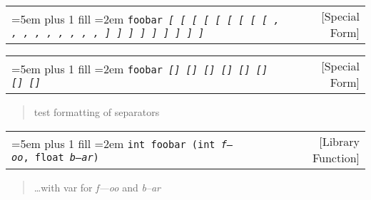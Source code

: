 \documentclass{book}
\newcommand\GNUTexinfocommandstyletextvar[1]{{\normalfont{}\textsl{#1}}}%
\begin{document}
\noindent\begin{tabularx}{\linewidth}{@{}Xr}
\rightskip=5em plus 1 fill
\hangindent=2em
\texttt{foobar \EmbracOn{}\textnormal{\textsl{[ \EmbracOff{}\textnormal{[}\EmbracOn{} \textsl{[} \texttt{[} \texttt{[} \EmbracOff{}\textnormal{\textsl{[}}\EmbracOn{} \EmbracOff{}\textnormal{\texttt{[}}\EmbracOn{} \EmbracOff{}\textnormal{\texttt{\textsl{[}}}\EmbracOn{} \EmbracOff{}\textnormal{\texttt{[}}\EmbracOn{} , \EmbracOff{}\textnormal{,}\EmbracOn{} \textsl{,} \texttt{,} \texttt{,} \EmbracOff{}\textnormal{\textsl{,}}\EmbracOn{} \EmbracOff{}\textnormal{\texttt{,}}\EmbracOn{} \EmbracOff{}\textnormal{\texttt{\textsl{,}}}\EmbracOn{} \EmbracOff{}\textnormal{\texttt{,}}\EmbracOn{} ] \EmbracOff{}\textnormal{]}\EmbracOn{} \textsl{]} \texttt{]} \texttt{]} \EmbracOff{}\textnormal{\textsl{]}}\EmbracOn{} \EmbracOff{}\textnormal{\texttt{]}}\EmbracOn{} \EmbracOff{}\textnormal{\texttt{\textsl{]}}}\EmbracOn{} \EmbracOff{}\textnormal{\texttt{]}}\EmbracOn{}}}\EmbracOff{}}& [Special Form]
\end{tabularx}

%

\noindent\begin{tabularx}{\linewidth}{@{}Xr}
\rightskip=5em plus 1 fill
\hangindent=2em
\texttt{foobar \EmbracOn{}\textnormal{\textsl{[] \EmbracOff{}\textnormal{[]}\EmbracOn{} \textsl{[]} \texttt{[]} \texttt{[]} \EmbracOff{}\textnormal{\textsl{[]}}\EmbracOn{} \EmbracOff{}\textnormal{\texttt{[]}}\EmbracOn{} \EmbracOff{}\textnormal{\texttt{\textsl{[]}}}\EmbracOn{}}}\EmbracOff{}}& [Special Form]
\end{tabularx}

%
\begin{quote}
\unskip{\parskip=0pt\noindent}%
test formatting of separators
\end{quote}


\noindent\begin{tabularx}{\linewidth}{@{}Xr}
\rightskip=5em plus 1 fill
\hangindent=2em
\texttt{int foobar (int\ \GNUTexinfocommandstyletextvar{f---oo},\ float\ \GNUTexinfocommandstyletextvar{b--ar})}& [Library Function]
\end{tabularx}

%
\begin{quote}
\unskip{\parskip=0pt\noindent}%
\dots{}\@ with var for \GNUTexinfocommandstyletextvar{f---oo} and \GNUTexinfocommandstyletextvar{b--ar}
\end{quote}
\end{document}
